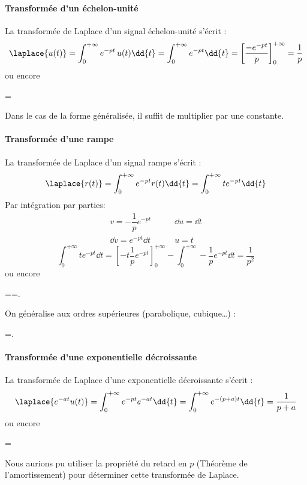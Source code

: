 \paragraph{Transformée d'un échelon-unité}
La transformée de Laplace d'un signal échelon-unité  s'écrit : 
$$
\laplace{u(t)}=\int_{0}^{+\infty}e^{-pt}\,u(t)\dd{t}
=\int_{0}^{+\infty} e^{-pt}\dd{t}
=\left[\dfrac{-e^{-pt}}{p}\right]_0^{+\infty}=\dfrac{1}{p}
$$
ou encore
\begin{bequation}
    =
\end{bequation}
Dans le cas de la forme généralisée, il suffit de multiplier par une constante.

\paragraph{Transformée d'une rampe}
La transformée de Laplace d'un signal rampe s'écrit :
$$
\laplace{r(t)}=\int_{0}^{+\infty} e^{-pt}r(t)\dd{t}
=\int_{0}^{+\infty} te^{-pt}\dd{t}
$$
Par intégration par parties:
\begin{align*}
    v=-\dfrac{1}{p}e^{-pt}\qquad&\dd{u}=\dd{t}\\
    \dd{v}=e^{-pt}\dd{t}\qquad&u=t
\end{align*}
$$
\int_{0}^{+\infty} te^{-pt}\dd{t}
=\left[-t\dfrac{1}{p}e^{-pt}\right]_0^{+\infty}-\int_{0}^{+\infty}
-\dfrac{1}{p}e^{-pt}\dd{t}=\dfrac{1}{p^2}
$$
ou encore
\begin{bequation}
    ==.
\end{bequation}

On généralise aux ordres supérieures (\og parabolique\fg, \og cubique\fg\ldots) :
\begin{bequation}
    =.
\end{bequation}


\paragraph{Transformée d'une exponentielle décroissante}
La transformée de Laplace d'une exponentielle décroissante s'écrit :
$$
\laplace{e^{-at}u(t)}=\int_{0}^{+\infty} e^{-pt}e^{-at}\dd{t}
=\int_{0}^{+\infty} e^{-(p+a)t}\dd{t} = \dfrac{1}{p+a}
$$
ou encore
\begin{bequation}
    =
\end{bequation}
Nous aurions pu utiliser la propriété du retard en $p$ 
(Théorème de l'amortissement) pour déterminer cette transformée de Laplace.


